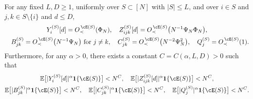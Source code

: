\begin{lemma}\label{lemm:bounds}
For any fixed $L,D \geq 1$, uniformly over $S \subset [N]$
with $|S| \leq L$, and over $i \in S$ and
$j,k \in S \setminus \{i\}$ and $d \leq D$,
\begin{equation}\label{eq:FAbounds}
\begin{gathered}
Y_i^{(S)}[d]=\SDcES{\Phi_N},
\quad Z_{ijk}^{(S)}[d]=\SDcES{N^{-1}\Psi_N\Phi_N},\\
\quad B_{jk}^{(S)}=\SDcES{N^{-1}\Psi_N} \text{ for } j \neq k,
\quad C_{jk}^{(S)}=\SDcES{N^{-2}\Psi_N^2},
\quad Q_j^{(S)}=\SDcES{1}.
\end{gathered}
\end{equation}
Furthermore, for any $\alpha>0$, there exists a constant
$C=C(\alpha,L,D)>0$ such that
\begin{equation}\label{eq:FAEbounds}
\begin{gathered}
\E\big[|Y_i^{(S)}[d]|^\alpha\bI\{\cE(S)\}\big]<N^C, \quad
\E\big[|Z_{ijk}^{(S)}[d]|^\alpha\bI\{\cE(S)\}\big]<N^C,\\
\E\big[|B_{jk}^{(S)}|^\alpha\bI\{\cE(S)\}\big]<N^C, \quad
\E\big[|C_{jk}^{(S)}|^\alpha\bI\{\cE(S)\}\big]<N^C, \quad
\E\big[|Q_j^{(S)}|^\alpha\bI\{\cE(S)\}\big]<N^C.
\end{gathered}
\end{equation}
\end{lemma}
